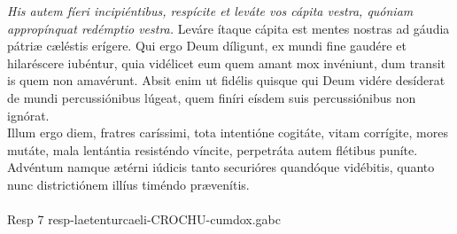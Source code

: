 \documentclass[options]{article}
\begin{document}
	\emph{His autem fíeri incipiéntibus, respícite et leváte vos cápita vestra, quóniam appropínquat redémptio vestra.} Leváre ítaque cápita est mentes nostras ad gáudia pátriæ cæléstis erígere. Qui ergo Deum díligunt, ex mundi fine gaudére et hilaréscere iubéntur, quia vidélicet eum quem amant mox invéniunt, dum transit is quem non amavérunt. Absit enim ut fidélis quisque qui Deum vidére desíderat de mundi percussiónibus lúgeat, quem finíri eísdem suis percussiónibus non ignórat.\\
	Illum ergo diem, fratres caríssimi, tota intentióne cogitáte, vitam corrígite, mores mutáte, mala lentántia resisténdo víncite, perpetráta autem flétibus puníte. Advéntum namque ætérni iúdicis tanto securióres quandóque vidébitis, quanto nunc districtiónem illíus timéndo prævenítis.\\
	\\
	
	Resp 7 resp-laetenturcaeli-CROCHU-cumdox.gabc
	
\end{document}
